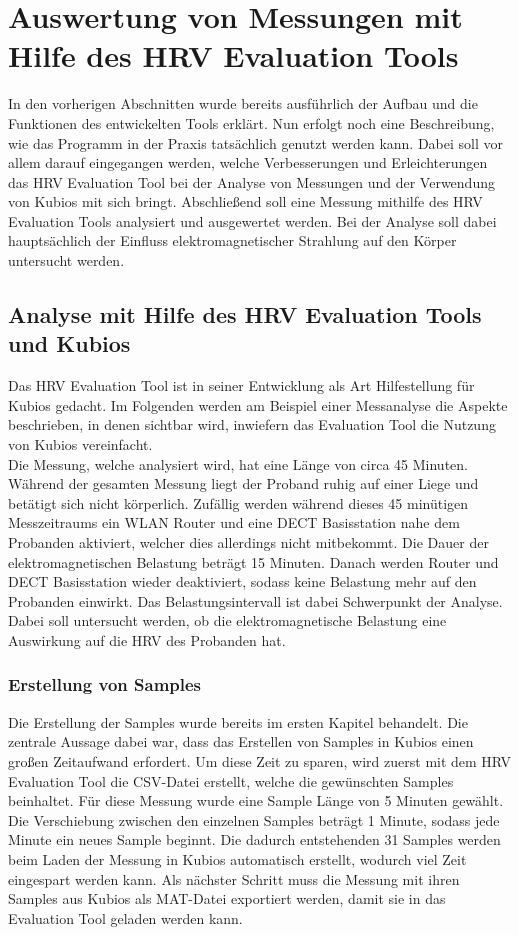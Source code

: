 
\chapter{Auswertung von Messungen mit Hilfe des HRV Evaluation Tools}
In den vorherigen Abschnitten wurde bereits ausführlich der Aufbau und die Funktionen des entwickelten Tools erklärt. Nun erfolgt noch eine Beschreibung, wie das Programm in der Praxis tatsächlich genutzt werden kann. Dabei soll vor allem darauf eingegangen werden, welche Verbesserungen und Erleichterungen das HRV Evaluation Tool bei der Analyse von Messungen und der Verwendung von Kubios mit sich bringt. Abschließend soll eine Messung mithilfe des HRV Evaluation Tools analysiert und ausgewertet werden. Bei der Analyse soll dabei hauptsächlich der Einfluss elektromagnetischer Strahlung auf den Körper untersucht werden. 

\section{Analyse mit Hilfe des  HRV Evaluation Tools und Kubios}
Das HRV Evaluation Tool ist in seiner Entwicklung als Art Hilfestellung für Kubios gedacht. Im Folgenden werden am Beispiel einer Messanalyse die Aspekte beschrieben, in denen sichtbar wird, inwiefern das Evaluation Tool die Nutzung von Kubios vereinfacht.\\

Die Messung, welche analysiert wird, hat eine Länge von circa 45 Minuten. Während der gesamten Messung liegt der Proband ruhig auf einer Liege und betätigt sich nicht körperlich. Zufällig werden während dieses 45 minütigen Messzeitraums ein WLAN Router und eine DECT Basisstation nahe dem Probanden aktiviert, welcher dies allerdings nicht mitbekommt. Die Dauer der elektromagnetischen Belastung beträgt 15 Minuten. Danach werden Router und DECT Basisstation wieder deaktiviert, sodass keine Belastung mehr auf den Probanden einwirkt. Das Belastungsintervall ist dabei Schwerpunkt der Analyse. Dabei soll untersucht werden, ob die elektromagnetische Belastung eine Auswirkung auf die \acs{HRV} des Probanden hat.

\subsection{Erstellung von Samples}
Die Erstellung der Samples wurde bereits im ersten Kapitel behandelt. Die zentrale Aussage dabei war, dass das Erstellen von Samples in Kubios einen großen Zeitaufwand erfordert. Um diese Zeit zu sparen, wird zuerst mit dem HRV Evaluation Tool  die \acs{CSV}-Datei erstellt, welche die gewünschten Samples beinhaltet.
Für diese Messung wurde eine Sample Länge von 5 Minuten gewählt. Die Verschiebung zwischen den einzelnen Samples beträgt 1 Minute, sodass jede Minute ein neues Sample beginnt. Die dadurch entstehenden 31 Samples werden beim Laden der Messung in Kubios automatisch erstellt, wodurch viel Zeit eingespart werden kann. Als nächster Schritt muss die Messung mit ihren Samples aus Kubios als MAT-Datei exportiert werden, damit sie in das Evaluation Tool geladen werden kann. 

